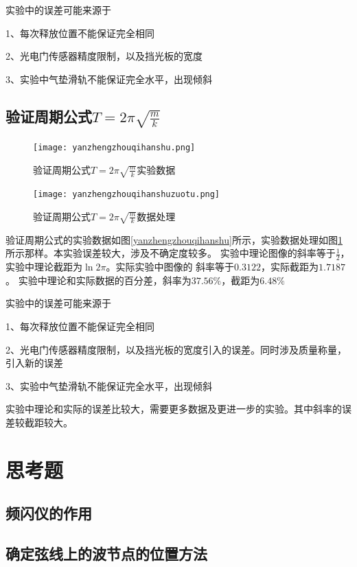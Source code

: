 \documentclass{ctexart}
\begin{document}
  实验中的误差可能来源于
  
  1、每次释放位置不能保证完全相同

  2、光电门传感器精度限制，以及挡光板的宽度

  3、实验中气垫滑轨不能保证完全水平，出现倾斜

  \subsection{验证周期公式$T=2\pi \sqrt{\frac{m}{k}}$}
  \begin{figure}[b]
    \centering
    \begin{minipage}[b]{0.48\textwidth}
      \centering
      \texttt{[image: yanzhengzhouqihanshu.png]}
      \caption{验证周期公式$T=2\pi \sqrt{\frac{m}{k}}$实验数据}\label{yanzhengzhouqihanshu}
    \end{minipage}
    \begin{minipage}[b]{0.48\textwidth}
      \centering
      \texttt{[image: yanzhengzhouqihanshuzuotu.png]}
      \caption{验证周期公式$T=2\pi \sqrt{\frac{m}{k}}$数据处理}\label{yanzhengzhouqigongshizuotu}
    \end{minipage}
  \end{figure}
  验证周期公式的实验数据如图\ref{yanzhengzhouqihanshu}所示，实验数据处理如图\ref{yanzhengzhouqigongshizuotu}
  所示那样。本实验误差较大，涉及不确定度较多。
  实验中理论图像的斜率等于$\frac{1}{2}$，实验中理论截距为$\ln{2\pi}$。实际实验中图像的
  斜率等于$0.3122$，实际截距为$1.7187$。
  实验中理论和实际数据的百分差，斜率为$37.56\%$，截距为$6.48\%$

  实验中的误差可能来源于 
  
  1、每次释放位置不能保证完全相同

  2、光电门传感器精度限制，以及挡光板的宽度引入的误差。同时涉及质量称量，引入新的误差

  3、实验中气垫滑轨不能保证完全水平，出现倾斜

  实验中理论和实际的误差比较大，需要更多数据及更进一步的实验。其中斜率的误差较截距较大。
\newpage

\section{思考题}
  \subsection{频闪仪的作用}

  \subsection{确定弦线上的波节点的位置方法}
\end{document}
